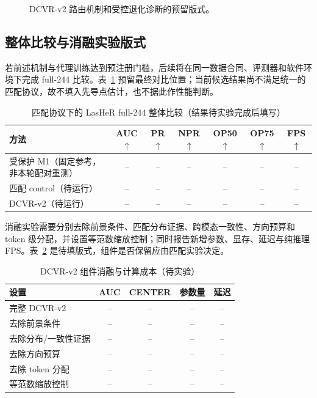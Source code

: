 \documentclass[journal]{IEEEtran}
\begin{document}
\begin{figure}[!t]
\centering
{}
\caption{DCVR-v2 路由机制和受控退化诊断的预留版式。}
\label{fig:diagnostics}
\end{figure}

\subsection{整体比较与消融实验版式}
若前述机制与代理训练达到预注册门槛，后续将在同一数据合同、评测器和软件环境下完成 full-244 比较。表~\ref{tab:main-result} 预留最终对比位置；当前候选结果尚不满足统一的匹配协议，故不填入先导点估计，也不据此作性能判断。
\begin{table}[!t]
\centering
\caption{匹配协议下的 LasHeR full-244 整体比较（结果待实验完成后填写）}
\label{tab:main-result}
\small
\begin{tabular}{lcccccc}
\toprule
方法 & AUC$\uparrow$ & PR$\uparrow$ & NPR$\uparrow$ & OP50$\uparrow$ & OP75$\uparrow$ & FPS$\uparrow$\\
\midrule
受保护 M1（固定参考，非本轮配对重测） & -- & -- & -- & -- & -- & --\\
匹配 control（待运行） & -- & -- & -- & -- & -- & --\\
DCVR-v2（待运行） & -- & -- & -- & -- & -- & --\\
\bottomrule
\end{tabular}
\end{table}

消融实验需要分别去除前景条件、匹配分布证据、跨模态一致性、方向预算和 token 级分配，并设置等范数缩放控制；同时报告新增参数、显存、延迟与纯推理 FPS。表~\ref{tab:ablation} 是待填版式，组件是否保留应由匹配实验决定。
\begin{table}[!t]
\centering
\caption{DCVR-v2 组件消融与计算成本（待实验）}
\label{tab:ablation}
\small
\begin{tabular}{@{}p{2.65cm}cccc@{}}
\toprule
设置 & AUC & CENTER & 参数量 & 延迟\\
\midrule
完整 DCVR-v2 & -- & -- & -- & --\\
去除前景条件 & -- & -- & -- & --\\
去除分布/一致性证据 & -- & -- & -- & --\\
去除方向预算 & -- & -- & -- & --\\
去除 token 分配 & -- & -- & -- & --\\
等范数缩放控制 & -- & -- & -- & --\\
\bottomrule
\end{tabular}
\end{table}
\end{document}
